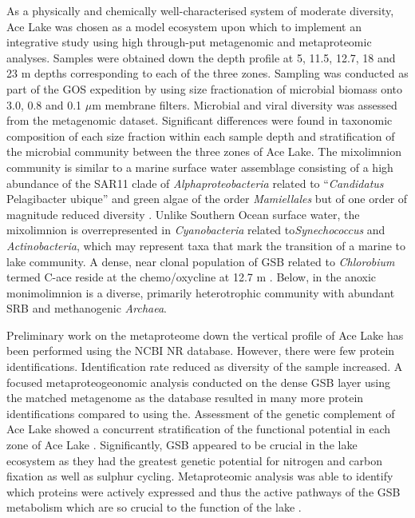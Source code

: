As a physically and chemically well-characterised system of moderate diversity, Ace Lake was chosen as a model ecosystem upon which to implement an integrative study using high through-put metagenomic and metaproteomic analyses.
Samples were obtained down the depth profile at 5, 11.5, 12.7, 18 and 23 m depths corresponding to each of the three zones.
Sampling was conducted as part of the \ac{GOS} expedition \cite{Rusch2007} by using size fractionation of microbial biomass onto 3.0, 0.8 and 0.1 $\mu$m membrane filters.
Microbial and viral diversity was assessed from the metagenomic dataset.
Significant differences were found in taxonomic composition of each size fraction within each sample depth and stratification of the microbial community between the three zones of Ace Lake.
The mixolimnion community is similar to a marine surface water assemblage consisting of a high abundance of the SAR11 clade of \emph{Alphaproteobacteria} related to ``\emph{Candidatus} Pelagibacter ubique'' and green algae of the order \emph{Mamiellales} but of one order of magnitude reduced diversity \cite{Lauro2011}.
Unlike Southern Ocean surface water, the mixolimnion is overrepresented in \emph{Cyanobacteria} related to\emph{Synechococcus} and \emph{Actinobacteria}, which may represent taxa that mark the transition of a marine to lake community.
A dense, near clonal population of \acl{GSB} related to \emph{Chlorobium} termed C-ace reside at the chemo/oxycline at 12.7 m \cite{Ng2010, Lauro2011}.
Below, in the anoxic monimolimnion is a diverse, primarily heterotrophic community with abundant \ac{SRB} and methanogenic \emph{Archaea}.

Preliminary work on the metaproteome down the vertical profile of Ace Lake has been performed using the \ac{NCBI} \ac{NR} database. %
However, there were few protein identifications.
Identification rate reduced as diversity of the sample increased.
A focused metaproteogeonomic analysis conducted on the dense \ac{GSB} layer using the matched metagenome as the database resulted in many more protein identifications compared to using the\cite{Ng2010}.
Assessment of the genetic complement of Ace Lake showed a concurrent stratification of the functional potential in each zone of Ace Lake \cite{Lauro2011}.
Significantly, \ac{GSB} appeared to be crucial in the lake ecosystem as they had the greatest genetic potential for nitrogen and carbon fixation as well as sulphur cycling\cite{Ng2010, Lauro2011}.
Metaproteomic analysis was able to identify which proteins were actively expressed and thus the active pathways of the \ac{GSB} metabolism which are so crucial to the function of the lake \cite{Ng2010}.

